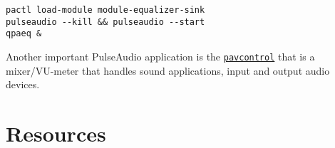 \begin{verbatim}
pactl load-module module-equalizer-sink
pulseaudio --kill && pulseaudio --start
qpaeq &
\end{verbatim}

Another important PulseAudio application is the
\texttt{\href{https://freedesktop.org/software/pulseaudio/pavucontrol/}{pavcontrol}}
that is a mixer/VU-meter that handles sound applications, input and
output audio devices.

\section{Resources}


